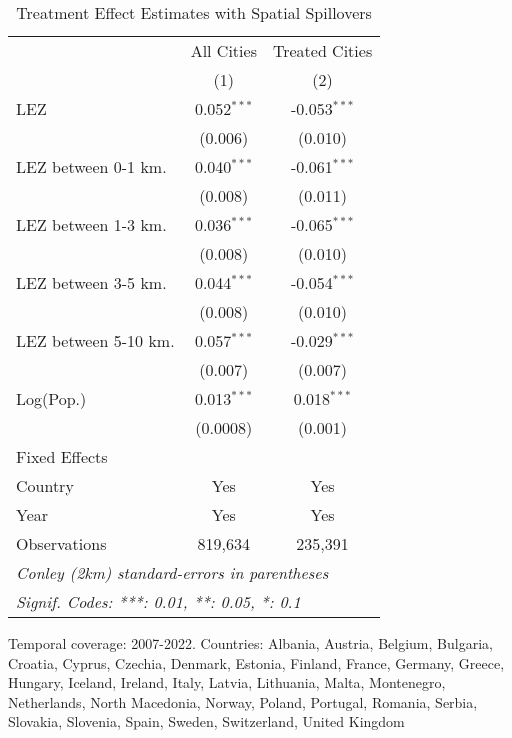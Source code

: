 
\begin{table}[htbp]
   \caption{\label{tab:te_spillovers_conley} Treatment Effect Estimates with Spatial Spillovers}
   \centering
   \small
   \begin{tabular}{lcc}
      \tabularnewline \midrule \midrule
                           & All Cities    & Treated Cities \\   
                           & (1)           & (2)\\  
      LEZ                  & 0.052$^{***}$ & -0.053$^{***}$\\   
                           & (0.006)       & (0.010)\\   
      LEZ between 0-1 km.  & 0.040$^{***}$ & -0.061$^{***}$\\   
                           & (0.008)       & (0.011)\\   
      LEZ between 1-3 km.  & 0.036$^{***}$ & -0.065$^{***}$\\   
                           & (0.008)       & (0.010)\\   
      LEZ between 3-5 km.  & 0.044$^{***}$ & -0.054$^{***}$\\   
                           & (0.008)       & (0.010)\\   
      LEZ between 5-10 km. & 0.057$^{***}$ & -0.029$^{***}$\\   
                           & (0.007)       & (0.007)\\   
      Log(Pop.)            & 0.013$^{***}$ & 0.018$^{***}$\\   
                           & (0.0008)      & (0.001)\\   
      Fixed Effects\\
      Country              & Yes           & Yes\\  
      Year                 & Yes           & Yes\\  
      \midrule 
      Observations         & 819,634       & 235,391\\  
      \midrule \midrule
      \multicolumn{3}{l}{\emph{Conley (2km) standard-errors in parentheses}}\\
      \multicolumn{3}{l}{\emph{Signif. Codes: ***: 0.01, **: 0.05, *: 0.1}}\\
   \end{tabular}
   
   \par \raggedright 
   Temporal coverage: 2007-2022. Countries: Albania, Austria, Belgium, Bulgaria, Croatia, Cyprus, Czechia, Denmark, Estonia, Finland, France, Germany, Greece, Hungary, Iceland, Ireland, Italy, Latvia, Lithuania, Malta, Montenegro, Netherlands, North Macedonia, Norway, Poland, Portugal, Romania, Serbia, Slovakia, Slovenia, Spain, Sweden, Switzerland, United Kingdom
\end{table}


